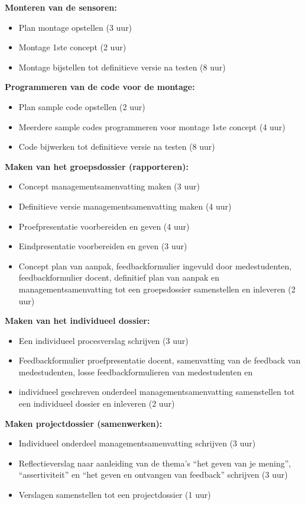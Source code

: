 \documentclass[oneside]{book}
\begin{document}
{\large \textbf{Monteren van de sensoren:}}
\begin{itemize}
\item Plan montage opstellen (3 uur)
\item Montage 1ste concept (2 uur)
\item Montage bijstellen tot definitieve versie na testen (8 uur)
\end{itemize}

{\large \textbf{Programmeren van de code voor de montage:}}
\begin{itemize}
\item Plan sample code opstellen (2 uur)
\item Meerdere sample codes programmeren  voor montage 1ste concept (4 uur)
\item Code bijwerken tot definitieve versie na testen (8 uur)
\end{itemize}

\clearpage

{\large \textbf{Maken van het groepsdossier (rapporteren):}}
\begin{itemize}
\item Concept managementsamenvatting maken (3 uur)
\item Definitieve versie managementsamenvatting maken (4 uur)
\item Proefpresentatie voorbereiden en geven (4 uur)
\item Eindpresentatie voorbereiden en geven (3 uur)
\item Concept plan van aanpak, feedbackformulier ingevuld door medestudenten, feedbackformulier docent, definitief plan van aanpak en managementsamenvatting tot een groepsdossier samenstellen en inleveren (2 uur)
\end{itemize}

{\large \textbf{Maken van het individueel dossier:}}
\begin{itemize}
\item Een individueel procesverslag schrijven (3 uur)
\item Feedbackformulier proefpresentatie docent, samenvatting van de feedback van medestudenten, losse feedbackformulieren van medestudenten en \item individueel geschreven onderdeel managementsamenvatting samenstellen tot een individueel dossier en inleveren (2 uur)
\end{itemize}

{\large \textbf{Maken projectdossier (samenwerken):}}
\begin{itemize}
\item Individueel onderdeel managementsamenvatting schrijven (3 uur)
\item Reflectieverslag naar aanleiding van de thema’s “het geven van je mening”, “assertiviteit” en “het geven en ontvangen van feedback” schrijven (3 uur)
\item Verslagen samenstellen tot een projectdossier (1 uur)
\end{itemize}
\end{document}
